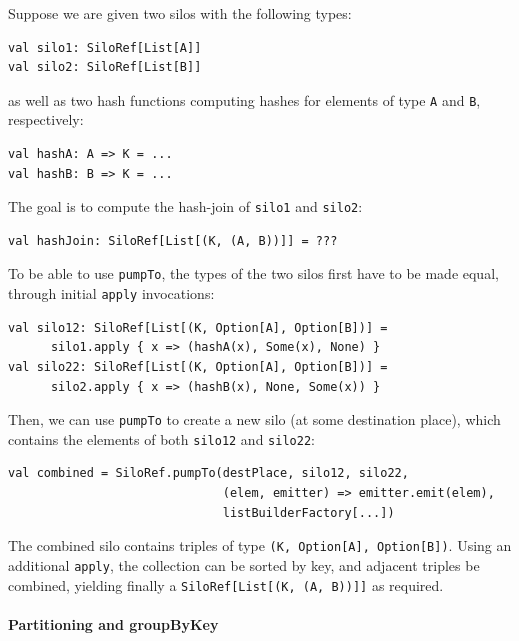 \documentclass{easychair}
\begin{document}
Suppose we are given two silos with the following types:
\begin{verbatim}
val silo1: SiloRef[List[A]]
val silo2: SiloRef[List[B]]
\end{verbatim}
\noindent
as well as two hash functions computing hashes for elements of type \verb|A| and \verb|B|, respectively:
\begin{verbatim}
val hashA: A => K = ...
val hashB: B => K = ...
\end{verbatim}
\noindent
The goal is to compute the hash-join of \verb|silo1| and \verb|silo2|:
\begin{verbatim}
val hashJoin: SiloRef[List[(K, (A, B))]] = ???
\end{verbatim}
\noindent
To be able to use \verb|pumpTo|, the types of the two silos first have to be made equal, through initial \verb|apply| invocations:
\begin{verbatim}
val silo12: SiloRef[List[(K, Option[A], Option[B])] =
      silo1.apply { x => (hashA(x), Some(x), None) }
val silo22: SiloRef[List[(K, Option[A], Option[B])] =
      silo2.apply { x => (hashB(x), None, Some(x)) }
\end{verbatim}
\noindent
Then, we can use \verb|pumpTo| to create a new silo (at some destination place), which contains the elements of both \verb|silo12| and \verb|silo22|:
\begin{verbatim}
val combined = SiloRef.pumpTo(destPlace, silo12, silo22,
                              (elem, emitter) => emitter.emit(elem),
                              listBuilderFactory[...])
\end{verbatim}
\noindent
The combined silo contains triples of type \verb|(K, Option[A], Option[B])|. Using an
additional \verb|apply|, the collection can be sorted by key, and adjacent triples be
combined, yielding finally a \verb|SiloRef[List[(K, (A, B))]]| as required.

\paragraph{Partitioning and groupByKey}
\end{document}
